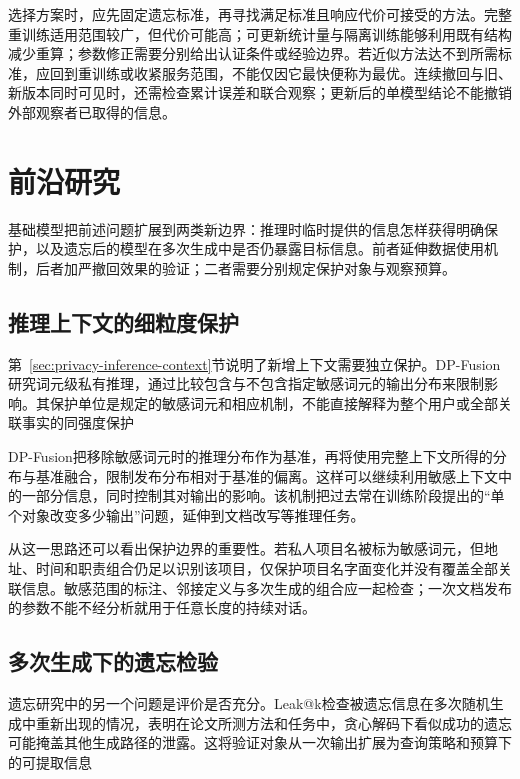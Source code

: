 选择方案时，应先固定遗忘标准，再寻找满足标准且响应代价可接受的方法。完整重训练适用范围较广，但代价可能高；可更新统计量与隔离训练能够利用既有结构减少重算；参数修正需要分别给出认证条件或经验边界。若近似方法达不到所需标准，应回到重训练或收紧服务范围，不能仅因它最快便称为最优。连续撤回与旧、新版本同时可见时，还需检查累计误差和联合观察；更新后的单模型结论不能撤销外部观察者已取得的信息。

\section{前沿研究}
\label{sec:privacy-frontiers}

基础模型把前述问题扩展到两类新边界：推理时临时提供的信息怎样获得明确保护，以及遗忘后的模型在多次生成中是否仍暴露目标信息。前者延伸数据使用机制，后者加严撤回效果的验证；二者需要分别规定保护对象与观察预算。

\subsection{推理上下文的细粒度保护}

第~\ref{sec:privacy-inference-context}节说明了新增上下文需要独立保护。DP-Fusion研究词元级私有推理，通过比较包含与不包含指定敏感词元的输出分布来限制影响。其保护单位是规定的敏感词元和相应机制，不能直接解释为整个用户或全部关联事实的同强度保护

DP-Fusion把移除敏感词元时的推理分布作为基准，再将使用完整上下文所得的分布与基准融合，限制发布分布相对于基准的偏离。这样可以继续利用敏感上下文中的一部分信息，同时控制其对输出的影响。该机制把过去常在训练阶段提出的“单个对象改变多少输出”问题，延伸到文档改写等推理任务。

从这一思路还可以看出保护边界的重要性。若私人项目名被标为敏感词元，但地址、时间和职责组合仍足以识别该项目，仅保护项目名字面变化并没有覆盖全部关联信息。敏感范围的标注、邻接定义与多次生成的组合应一起检查；一次文档发布的参数不能不经分析就用于任意长度的持续对话。

\subsection{多次生成下的遗忘检验}

遗忘研究中的另一个问题是评价是否充分。Leak@k检查被遗忘信息在多次随机生成中重新出现的情况，表明在论文所测方法和任务中，贪心解码下看似成功的遗忘可能掩盖其他生成路径的泄露。这将验证对象从一次输出扩展为查询策略和预算下的可提取信息

